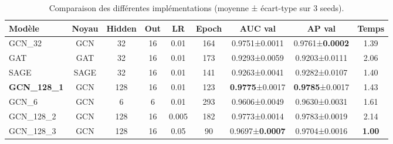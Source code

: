 \documentclass[french]{llncs}
\begin{document}
{
\renewcommand{\arraystretch}{1.25}
\small
\begin{table}[H]
\centering
\caption{Comparaison des différentes implémentations (moyenne ± écart-type sur 3 seeds).}
\label{tab_compar}
\begin{tabular}{l c c c c c c c c}
\toprule
\textbf{Modèle} & \textbf{Noyau} & \textbf{Hidden} & \textbf{Out} &
\textbf{LR} & \textbf{Epoch} &
\textbf{AUC val} & \textbf{AP val} & \textbf{Temps} \\
\midrule
GCN\_32 & GCN & 32 & 16 & 0.01 & 164 &
0.9751±0.0011 & 0.9761±\textbf{0.0002} & 1.39 \\
GAT & GAT & 32 & 16 & 0.01 & 173 &
0.9293±0.0059 & 0.9203±0.0111 & 2.06 \\
SAGE & SAGE & 32 & 16 & 0.01 & 141 &
0.9263±0.0041 & 0.9282±0.0107 & 1.40 \\
\midrule
\textbf{GCN\_128\_1} & GCN & 128 & 16 & 0.01 & 123 &
\textbf{0.9775}±0.0017 & \textbf{0.9785}±0.0017 & 1.43 \\
GCN\_6 & GCN & 6 & 6 & 0.01 & 293 &
0.9606±0.0049 & 0.9630±0.0031 & 1.61 \\
GCN\_128\_2 & GCN & 128 & 16 & 0.005 & 182 &
0.9773±0.0014 & 0.9783±0.0019 & 2.14 \\
GCN\_128\_3 & GCN & 128 & 16 & 0.05 & 90 &
0.9697±\textbf{0.0007} & 0.9704±0.0016 & \textbf{1.00} \\
\bottomrule
\end{tabular}
\end{table}
}
\end{document}
